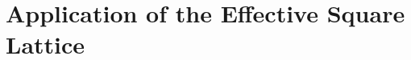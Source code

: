 \section{Application of the Effective Square Lattice}
\label{Sec: EMT Application}
\begin{comment} 
In Figure \ref{fig:wire_length_dens_theory}(a) the effective square lattice summarised in equation \ref{eq:combined_emt} is plot against average values of sheet resistance for various wire densities. Data points are the average conductance with 95\% confidence intervals of Monte Carlo simulations of NWNs of size $20~\mu m^2 \times 20~\mu m^2$, wires of length $7 ~ \mu m$ and in a network of size with other parameters corresponding to those characteristic of Ag/PVP NWNs used throughout this thesis\cite{rocha2015}. The blue curve is a visualisation of equation \ref{eq:combined_emt} and agrees closely with simulated data, lying within the confidence interval for each data point. The inset graph presents equation \ref{eq:combined_emt} in blue plot in a log-log plot with a curve $\propto n_w^{-1.7}$ meant as a guide to the eye. Two scaling regions can be identified in Figure \ref{fig:wire_length_dens_theory}, namely $n_w < 0.25$ and $n_w > 0.25$. In the low-density range, the sheet resistance has a varying scaling behaviour but converges to a power law $\propto n_w^{ -1.7}$ in the latter region.

\fig{1}
{Images/Chapter4/geometric_parameters.pdf}
{\textbf{Plot:} EMT applied to wire density and length scaling}
{ (a) The dependence of sheet resistance on wire densities. Data points represent the average sheet resistance for 20 simulations for each given wire density performed in a NWN of size $20 \mu m \times 20 \mu m$ with wires of length $6.7 \mu m$ and resistance values are those characteristic for Ag PVP wires. The 95\% confidence intervals are also plot. The theoretical sheet resistance calculated using Equation \ref{eq:combined_emt} is represented by the blue curve. The inset Log-Log figure presents the theoretical curve with alongside a power law $\propto n_w^{-1.7}$ which converge at higher wire densities. (b) The dependence of sheet resistance on the wire length. Data points represent the average sheet resistance for 20 simulations with wire densities of 0.4 $\mu m^-2$, other parameters are the same as those in (a). The theoretical values obtained by Equation \ref{eq:combined_emt} are shown as the red curve. The inset curve shows the theoretical curve in a Log-Log plot and shows a clear power law dependence between $R_s$ and wire length. MAKE INSET}
{fig:wire_length_dens_theory}


\end{comment}
